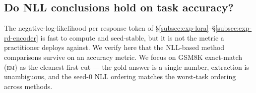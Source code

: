 
\subsection{Do NLL conclusions hold on task accuracy?}
\label{subsec:exp-downstream-gsm8k}

The negative-log-likelihood per response token of
\S\ref{subsec:exp-lora}--\S\ref{subsec:exp-rd-encoder} is fast to
compute and seed-stable, but it is not the metric a practitioner
deploys against. We verify here that the NLL-based method
comparisons survive on an accuracy metric. We focus on GSM8K
exact-match (\textsc{em}) as the cleanest first cut --- the gold
answer is a single number, extraction is unambiguous, and the
seed-0 NLL ordering matches the worst-task ordering across methods.

